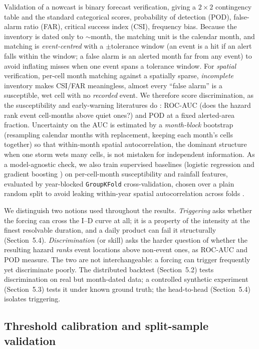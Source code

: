 \documentclass[authoryear,preprint,review,12pt]{elsarticle}
\begin{document}
Validation of a nowcast is binary forecast verification, giving a $2\times2$
contingency table and the standard categorical scores, probability of detection
(POD), false-alarm ratio (FAR), critical success index (CSI), frequency bias.
Because the inventory is dated only to $\sim$month, the matching unit is the
calendar month, and matching is \emph{event-centred} with a $\pm$tolerance window
(an event is a hit if an alert falls within the window; a false alarm is an
alerted month far from any event) to avoid inflating misses when one event spans
a tolerance window. For \emph{spatial} verification, per-cell month matching
against a spatially sparse, \emph{incomplete} inventory makes CSI/FAR
meaningless, almost every ``false alarm'' is a susceptible, wet cell with no
\emph{recorded} event. We therefore score discrimination, as the susceptibility
and early-warning literatures do \citep{reichenbach2018}: ROC-AUC \citep{hanley1982} (does the hazard
rank event cell-months above quiet ones?) and POD at a fixed alerted-area
fraction. Uncertainty on the AUC is estimated by a \emph{month-block} bootstrap
(resampling calendar months with replacement, keeping each month's cells
together) so that within-month spatial autocorrelation, the dominant structure
when one storm wets many cells, is not mistaken for independent information. As a
model-agnostic check, we also train supervised baselines (logistic regression and
gradient boosting \citep{friedman2001}) on per-cell-month susceptibility and rainfall features,
evaluated by year-blocked \texttt{GroupKFold} cross-validation, chosen over a
plain random split to avoid leaking within-year spatial autocorrelation across
folds \citep{roberts2016}.

We distinguish two notions used throughout the results. \emph{Triggering} asks
whether the forcing can cross the I--D curve at all; it is a property of the
intensity at the finest resolvable duration, and a daily product can fail it
structurally (Section~5.4). \emph{Discrimination} (or skill) asks the harder
question of whether the resulting hazard \emph{ranks} event locations above
non-event ones, as ROC-AUC and POD measure. The two are not interchangeable: a
forcing can trigger frequently yet discriminate poorly. The distributed backtest
(Section~5.2) tests discrimination on real but month-dated data; a controlled
synthetic experiment (Section~5.3) tests it under known ground truth; the
head-to-head (Section~5.4) isolates triggering.

\subsection{Threshold calibration and split-sample validation}
\end{document}
